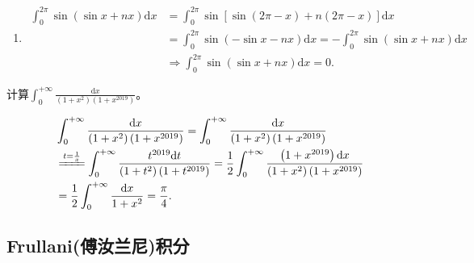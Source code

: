 \documentclass[../../main.tex]{subfiles}
\begin{document}
\begin{solution}
\begin{enumerate}
\item\begin{align*}
\int_0^{2\pi}{\sin \left( \sin x+nx \right) \mathrm{d}x}&=\int_0^{2\pi}{\sin \left[ \sin \left( 2\pi -x \right) +n\left( 2\pi -x \right) \right] \mathrm{d}x}
\\
&=\int_0^{2\pi}{\sin \left( -\sin x-nx \right) \mathrm{d}x}=-\int_0^{2\pi}{\sin \left( \sin x+nx \right) \mathrm{d}x}
\\
&\Longrightarrow \int_0^{2\pi}{\sin \left( \sin x+nx \right) \mathrm{d}x}=0.
\end{align*} 
\end{enumerate}

\end{solution}

\begin{example}
计算$\int_{0}^{+\infty} \frac{\mathrm{d}x}{\left(1 + x^2\right)\left(1 + x^{2019}\right)}$。
\end{example}
\begin{solution}
\begin{align*}
&\int_0^{+\infty}{\frac{\mathrm{d}x}{\left( 1+x^2 \right) \left( 1+x^{2019} \right)}}=\int_0^{+\infty}{\frac{\mathrm{d}x}{\left( 1+x^2 \right) \left( 1+x^{2019} \right)}}
\\
&\xlongequal{t=\frac{1}{x}}\int_0^{+\infty}{\frac{t^{2019}\mathrm{d}t}{\left( 1+t^2 \right) \left( 1+t^{2019} \right)}}=\frac{1}{2}\int_0^{+\infty}{\frac{\left( 1+x^{2019} \right) \mathrm{d}x}{\left( 1+x^2 \right) \left( 1+x^{2019} \right)}}
\\
&=\frac{1}{2}\int_0^{+\infty}{\frac{\mathrm{d}x}{1+x^2}}=\frac{\pi}{4}.
\end{align*}

\end{solution}




\subsection{Frullani(傅汝兰尼)积分}
\end{document}
